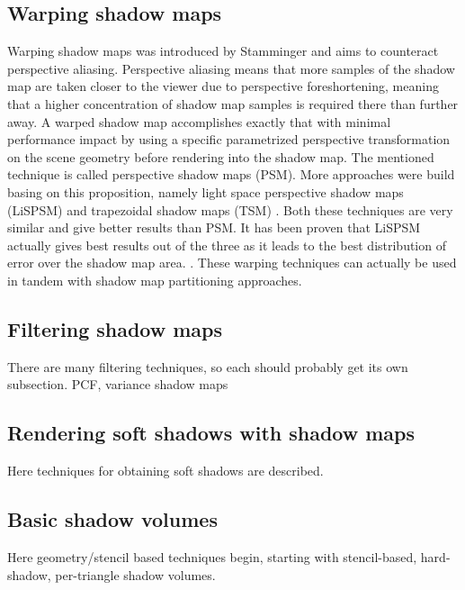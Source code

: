 \subsection{Warping shadow maps}
Warping shadow maps was introduced by Stamminger \cite{bib:article:stamminger_psm} and aims to counteract perspective aliasing. Perspective aliasing means that more samples of the shadow map are taken closer to the viewer due to perspective foreshortening, meaning that a higher concentration of shadow map samples is required there than further away. A warped shadow map accomplishes exactly that with minimal performance impact by using a specific parametrized perspective transformation on the scene geometry before rendering into the shadow map. The mentioned technique is called perspective shadow maps (PSM). More approaches were build basing on this proposition, namely light space perspective shadow maps (LiSPSM) \cite{bib:proc:wimmer_lispsm} and trapezoidal shadow maps (TSM) \cite{bib:proc:matrin_tsm}. Both these techniques are very similar and give better results than PSM. It has been proven that LiSPSM actually gives best results out of the three as it leads to the best distribution of error over the shadow map area. \cite{bib:proc:lloyd_lispsm_vs_tsm}. These warping techniques can actually be used in tandem with shadow map partitioning approaches.


\subsection{Filtering shadow maps}
There are many filtering techniques, so each should probably get its own subsection. PCF, variance shadow maps

\subsection{Rendering soft shadows with shadow maps}
Here techniques for obtaining soft shadows are described.

\subsection{Basic shadow volumes}
Here geometry/stencil based techniques begin, starting with stencil-based, hard-shadow, per-triangle shadow volumes.

